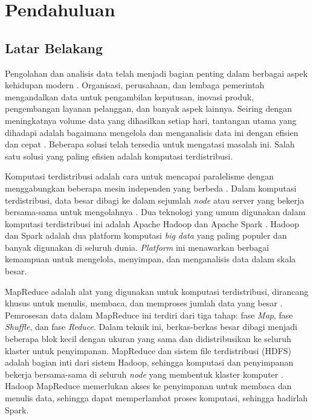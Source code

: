 \chapter{Pendahuluan}

\pagestyle{plain}

\section{Latar Belakang}

Pengolahan dan analisis data telah menjadi bagian penting dalam berbagai aspek kehidupan modern \cite{vermaBigDataManagement2016}. Organisasi, perusahaan, dan lembaga pemerintah mengandalkan data untuk pengambilan keputusan, inovasi produk, pengembangan layanan pelanggan, dan banyak aspek lainnya. Seiring dengan meningkatnya volume data yang dihasilkan setiap hari, tantangan utama yang dihadapi adalah bagaimana mengelola dan menganalisis data ini dengan efisien dan cepat \cite{ahmadvandGapproxUsingGallup2019}. Beberapa solusi telah tersedia untuk mengatasi masalah ini. Salah satu solusi yang paling efisien adalah komputasi terdistribusi. 

Komputasi terdistribusi adalah cara untuk mencapai paralelisme dengan menggabungkan beberapa mesin independen yang berbeda \cite{bhattacharyaEvaluatingDistributedComputing2021}. Dalam komputasi terdistribusi, data besar dibagi ke dalam sejumlah \textit{node} atau server yang bekerja bersama-sama untuk mengolahnya \cite{ahmedComprehensivePerformanceAnalysis2020}. Dua teknologi yang umum digunakan dalam komputasi terdistribusi ini adalah Apache Hadoop dan Apache Spark \cite{saputroPerbandinganKinerjaKomputasi2020}. Hadoop dan Spark adalah dua platform komputasi \textit{big data} yang paling populer dan banyak digunakan di seluruh dunia. \textit{Platform} ini menawarkan berbagai kemampuan untuk mengelola, menyimpan, dan menganalisis data dalam skala besar. 

MapReduce adalah alat yang digunakan untuk komputasi terdistribusi, dirancang khusus untuk menulis, membaca, dan memproses jumlah data yang besar \cite{deanMapReduceSimplifiedData2004}. Pemrosesan data dalam MapReduce ini terdiri dari tiga tahap: fase \textit{Map}, fase \textit{Shuffle}, dan fase \textit{Reduce}. Dalam teknik ini, berkas-berkas besar dibagi menjadi beberapa blok kecil dengan ukuran yang sama dan didistribusikan ke seluruh klaster untuk penyimpanan. MapReduce dan sistem file terdistribusi (HDFS) adalah bagian inti dari sistem Hadoop, sehingga komputasi dan penyimpanan bekerja bersama-sama di seluruh \textit{node} yang membentuk klaster komputer \cite{samadiComparativeStudyHadoop2016}. Hadoop MapReduce memerlukan akses ke penyimpanan untuk membaca dan menulis data, sehingga dapat memperlambat proses komputasi, sehingga hadirlah Spark.


